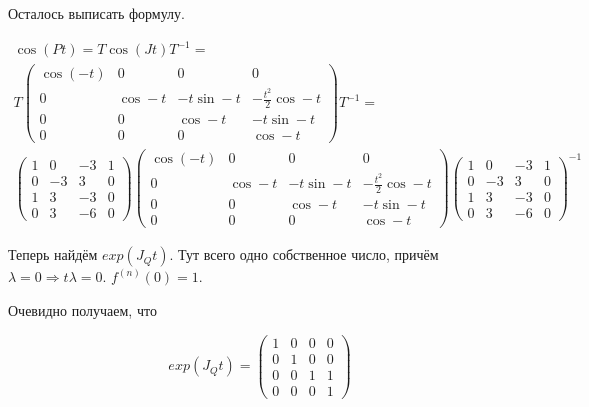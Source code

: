 \documentclass[12pt, a4paper]{article}
\begin{document}
    Осталось выписать формулу.

    \begin{multline}
        \cos(Pt) = T \cos(Jt) T^{-1} =  \\
        T \left(\begin{matrix}
            \cos (-t) & 0 & 0 & 0 \\
            0 & \cos -t & -t \sin -t & -\frac{t^2}{2} \cos -t \\
            0 & 0 & \cos -t & -t \sin -t \\
            0 & 0 & 0 & \cos -t
        \end{matrix}\right) T^{-1} = \\
        \left(\begin{matrix}
            1 & 0 & -3 & 1 \\
            0 & -3 & 3 & 0 \\
            1 & 3 & -3 & 0 \\
            0 & 3 & -6 & 0
        \end{matrix}\right) \left(\begin{matrix}
            \cos (-t) & 0 & 0 & 0 \\
            0 & \cos -t & -t \sin -t & -\frac{t^2}{2} \cos -t \\
            0 & 0 & \cos -t & -t \sin -t \\
            0 & 0 & 0 & \cos -t
        \end{matrix}\right) \left(\begin{matrix}
            1 & 0 & -3 & 1 \\
            0 & -3 & 3 & 0 \\
            1 & 3 & -3 & 0 \\
            0 & 3 & -6 & 0
        \end{matrix}\right)^{-1}
    \end{multline}

    Теперь найдём $exp(J_Q t)$. Тут всего одно собственное число, причём $\lambda = 0 \Longrightarrow t\lambda = 0$.
    $f^{(n)}(0) = 1$.

    Очевидно получаем, что
    
    \begin{equation}
        exp(J_Q t) = \left(\begin{matrix}
            1 & 0 & 0 & 0 \\
            0 & 1 & 0 & 0 \\
            0 & 0 & 1 & 1 \\
            0 & 0 & 0 & 1
        \end{matrix}\right)
    \end{equation}
\end{document}
